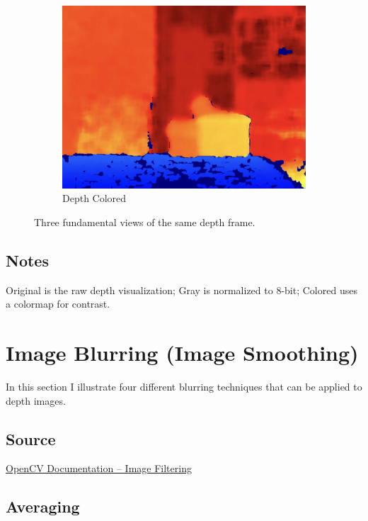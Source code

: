 \documentclass[a4paper,11pt]{article}
\begin{document}
\begin{figure}[H]
\begin{subfigure}{0.32\textwidth}
			\centering
			\includegraphics[width=\linewidth]{Images/depth_colored.png}
			\caption{Depth Colored}
		\end{subfigure}
		
		\caption{Three fundamental views of the same depth frame.}
	\end{figure}
	
	\subsection*{Notes}
	Original is the raw depth visualization; Gray is normalized to 8-bit; Colored uses a colormap for contrast.
	
	\section{Image Blurring (Image Smoothing)}
	
	In this section I illustrate four different blurring techniques that can be applied to depth images.  
	
	\subsection*{Source}
	\href{https://docs.opencv.org/4.x/d4/d13/tutorial_py_filtering.html}{OpenCV Documentation – Image Filtering}
	
	\subsection{Averaging}
\end{document}
